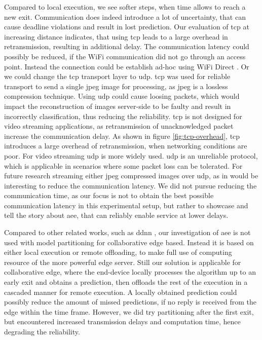 Compared to local execution, we see softer steps, when time allows to reach a new exit. Communication does indeed introduce a lot of uncertainty, that can cause deadline violations and result in lost prediction. Our evaluation of \gls{tcp} at increasing distance indicates, that using \gls{tcp} leads to a large overhead in retransmission, resulting in additional delay. The communication latency could possibly be reduced, if the WiFi communication did not go through an access point. Instead the connection could be establish ad-hoc using WiFi Direct \cite{noauthor_wi-fi_nodate}. Or we could change the \gls{tcp} transport layer to \gls{udp}. \gls{tcp} was used for reliable transport to send a single jpeg image for processing, as jpeg is a lossless compression technique. Using \gls{udp} could cause loosing packets, which would impact the reconstruction of images server-side to be faulty and result in incorrectly classification, thus reducing the reliability. \gls{tcp} is not designed for video streaming applications, as retransmission of unacknowledged packet increase the communication delay. As shown in figure \ref{fig:tcp-overhead}, \gls{tcp} introduces a large overhead of retransmission, when networking conditions are poor. For video streaming \gls{udp} is more widely used. \gls{udp} is an unreliable protocol, which is applicable in scenarios where some packet loss can be tolerated. For future research streaming either jpeg compressed images over \gls{udp}, as in \cite{liu_maximizing_2019} would be interesting to reduce the communication latency. We did not pursue reducing the communication time, as our focus is not to obtain the best possible communication latency in this experimental setup, but rather to showcase and tell the story about \gls{aee}, that can reliably enable service at lower delays.

Compared to other related works, such as \gls{ddnn} \cite{teerapittayanon_distributed_2017}, our investigation of \gls{aee} is not used with model partitioning for collaborative edge based. Instead it is based on either local execution or remote offloading, to make full use of computing resource of the more powerful edge server. Still our solution is applicable for collaborative edge, where the end-device locally processes the algorithm up to an early exit and obtains a prediction, then offloads the rest of the execution in a cascaded manner for remote execution. A locally obtained prediction could possibly reduce the amount of missed predictions, if no reply is received from the edge within the time frame. However, we did try partitioning after the first exit, but encountered increased transmission delays and computation time, hence degrading the reliability. 

